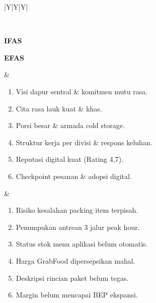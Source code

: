 \clearpage
\begingroup
    \scriptsize
    \setlength{\tabcolsep}{4pt}
    \setlength{\aboverulesep}{0pt}
    \setlength{\belowrulesep}{0pt}
    \begin{xltabular}{\textwidth}{|Y|Y|Y|}
        \caption{Formulasi Matriks SWOT Nasi Gerilya pada GrabFood}
        \label{tab:swot-bab4}\\
        \toprule
        \begin{minipage}[t][5.15cm][t]{\linewidth}
        \hfill\textbf{IFAS}\par
        \vfill
        \textbf{EFAS}\hfill{}%
        \end{minipage}
         &
        \begin{enumerate}[label=\textbf{S\arabic*.},leftmargin=1.5em,nosep,itemsep=0pt,topsep=1pt,parsep=0pt,partopsep=0pt]
            \item Visi dapur sentral \& komitmen mutu rasa.
            \item Cita rasa lauk kuat \& khas.
            \item Porsi besar \& armada cold storage.
            \item Struktur kerja per divisi \& respons keluhan.
            \item Reputasi digital kuat (Rating 4,7).
            \item Checkpoint pesanan \& adopsi digital.
        \end{enumerate} &
        \begin{enumerate}[label=\textbf{W\arabic*.},leftmargin=1.5em,nosep,itemsep=0pt,topsep=1pt,parsep=0pt,partopsep=0pt]
            \item Risiko kesalahan packing item terpisah.
            \item Penumpukan antrean 3 jalur peak hour.
            \item Status stok menu aplikasi belum otomatis.
            \item Harga GrabFood dipersepsikan mahal.
            \item Deskripsi rincian paket belum tegas.
            \item Margin belum mencapai BEP ekspansi.
        \end{enumerate} \\ \hline

\end{xltabular}
